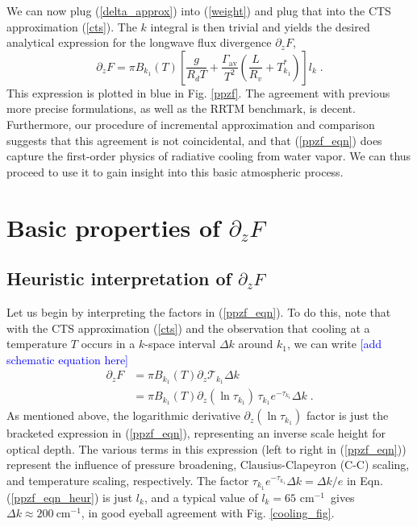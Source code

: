 \documentclass[10pt]{article}
\newcommand{\comment}[1]{\textcolor{blue}{[{#1}]}}
\newcommand{\beqn}{\begin{equation}}
\newcommand{\eeqn}{\end{equation}}
\newcommand{\eqnref}[1]{(\ref{#1})}
\newcommand{\n}{\nonumber}
\newcommand{\ppz}{\ensuremath{\partial_z}}
\newcommand{\FLW}{\ensuremath{F}}
\newcommand{\trans}{\ensuremath{\mathcal{T}}}
\newcommand{\cminverse}{\ensuremath{\mathrm{cm^{-1}}}}
\newcommand{\gammaav}{\ensuremath{\Gamma_\mathrm{av}}}
\begin{document}
We can now plug  \eqnref{delta_approx} into \eqnref{weight} and plug that into the  CTS approximation \eqnref{cts}. The $k$ integral is then trivial and yields the desired analytical expression for the longwave flux divergence $\ppz F$, 
	\beqn
		\ppz \FLW = \pi B_{k_1}(T)\left[\frac{g}{R_d T} + \frac{ \gammaav}{ T^2}\left(\frac{L}{R_v} + T_{k_1}^*\right) \right] l_k \; .
	\label{ppzf_eqn}
	\eeqn
This expression is plotted in blue in Fig. \ref{ppzf}. The agreement with previous more precise formulations, as well as the RRTM benchmark, is decent. Furthermore,  our procedure of incremental approximation and comparison suggests that this agreement is not coincidental, and that  \eqnref{ppzf_eqn} does capture the first-order physics of radiative cooling from water vapor. We can thus proceed to use it to gain insight into this basic atmospheric process.

\section{Basic properties of $\ppz \FLW$}
	\subsection{Heuristic interpretation of $\ppz F$} 
	Let us begin by interpreting the factors in \eqnref{ppzf_eqn}. To do this, note that with the CTS approximation \eqnref{cts} and the observation that cooling at a temperature $T$ occurs in a $k$-space interval $\Delta k$ around $k_1$, we can write \comment{add schematic equation here}
	\begin{align}
		\ppz \FLW & =  \pi B_{k_1}(T) \ppz \trans_{k_1} \Delta k \n \\
				 & =  \pi B_{k_1}(T) \ppz(\ln \tau_{k_1}) \, \tau_{k_1}e^{-\tau_{k_1}} \Delta k \; . 
					\label{ppzf_eqn_heur}
	\end{align}
As mentioned above, the logarithmic derivative $\ppz (\ln \tau_{k_1})$ factor is just the bracketed expression in \eqnref{ppzf_eqn}, representing an  inverse scale height for optical depth. The various terms in this expression (left to right in \eqnref{ppzf_eqn}) represent the influence of pressure broadening,  Clausius-Clapeyron (C-C) scaling, and temperature scaling, respectively. The factor $\tau_{k_1}e^{-\tau_{k_1}} \Delta k = \Delta k/e$ in Eqn. \eqnref{ppzf_eqn_heur} is just $l_k$, and a typical value of $l_k = 65$ \cminverse\ gives $\Delta k \approx 200\ \cminverse$, in good eyeball agreement with Fig. \ref{cooling_fig}.
\end{document}
